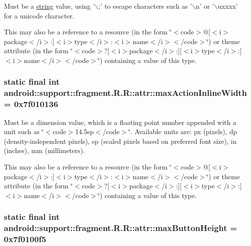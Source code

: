 Must be a \hyperlink{classandroid_1_1support_1_1fragment_1_1_r_1_1string}{string} value, using '$\backslash$;' to escape characters such as '$\backslash$n' or '$\backslash$uxxxx' for a unicode character. 

This may also be a reference to a resource (in the form \char`\"{}$<$code$>$@\mbox{[}$<$i$>$package$<$/i$>$:\mbox{]}$<$i$>$type$<$/i$>$:$<$i$>$name$<$/i$>$$<$/code$>$\char`\"{}) or theme attribute (in the form \char`\"{}$<$code$>$?\mbox{[}$<$i$>$package$<$/i$>$:\mbox{]}\mbox{[}$<$i$>$type$<$/i$>$:\mbox{]}$<$i$>$name$<$/i$>$$<$/code$>$\char`\"{}) containing a value of this type. \hypertarget{classandroid_1_1support_1_1fragment_1_1_r_1_1attr_6d7402c24984cb3becbb6d27ecb9ce9a}{
\subsubsection[{maxActionInlineWidth}]{\setlength{\rightskip}{0pt plus 5cm}static final int android::support::fragment.R.R::attr::maxActionInlineWidth = 0x7f010136}}
\label{classandroid_1_1support_1_1fragment_1_1_r_1_1attr_6d7402c24984cb3becbb6d27ecb9ce9a}


Must be a dimension value, which is a floating point number appended with a unit such as \char`\"{}$<$code$>$14.5sp$<$/code$>$\char`\"{}. Available units are: px (pixels), dp (density-independent pixels), sp (scaled pixels based on preferred font size), in (inches), mm (millimeters). 

This may also be a reference to a resource (in the form \char`\"{}$<$code$>$@\mbox{[}$<$i$>$package$<$/i$>$:\mbox{]}$<$i$>$type$<$/i$>$:$<$i$>$name$<$/i$>$$<$/code$>$\char`\"{}) or theme attribute (in the form \char`\"{}$<$code$>$?\mbox{[}$<$i$>$package$<$/i$>$:\mbox{]}\mbox{[}$<$i$>$type$<$/i$>$:\mbox{]}$<$i$>$name$<$/i$>$$<$/code$>$\char`\"{}) containing a value of this type. \hypertarget{classandroid_1_1support_1_1fragment_1_1_r_1_1attr_fc5af801867e99df95ae06c2d8c34948}{
\subsubsection[{maxButtonHeight}]{\setlength{\rightskip}{0pt plus 5cm}static final int android::support::fragment.R.R::attr::maxButtonHeight = 0x7f0100f5}}
\label{classandroid_1_1support_1_1fragment_1_1_r_1_1attr_fc5af801867e99df95ae06c2d8c34948}


